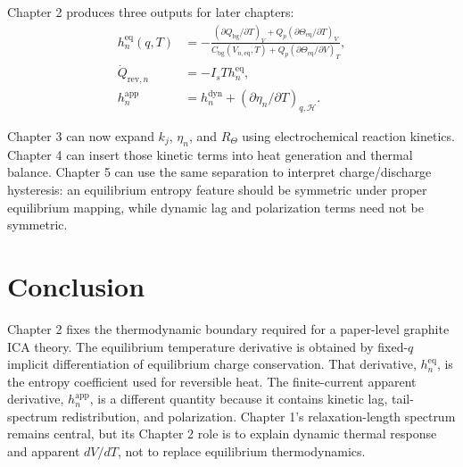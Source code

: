 \documentclass[11pt,a4paper]{article}
\newcommand{\eqs}{\mathrm{eq}}
\newcommand{\dyn}{\mathrm{dyn}}
\newcommand{\app}{\mathrm{app}}
\newcommand{\rev}{\mathrm{rev}}
\newcommand{\bg}{\mathrm{bg}}
\newcommand{\calH}{\mathcal H}
\begin{document}
Chapter 2 produces three outputs for later chapters:
\begin{align}
h_n^{\eqs}(q,T)
&=
-\frac{
\left(\partial Q_{\bg}/\partial T\right)_V
+Q_p\left(\partial\Theta_{\eqs}/\partial T\right)_V}
{C_{\bg}(V_{n,\eqs},T)
+Q_p\left(\partial\Theta_{\eqs}/\partial V\right)_T},
\label{eq:handoff_heq}\\
\dot Q_{\rev,n}
&=
-I_sT h_n^{\eqs},
\label{eq:handoff_qrev}\\
h_n^{\app}
&=
h_n^{\dyn}
+
\left(\partial\eta_n/\partial T\right)_{q,\calH}.
\label{eq:handoff_happ}
\end{align}

Chapter 3 can now expand \(k_j\), \(\eta_n\), and \(R_{\Theta}\) using electrochemical reaction kinetics.
Chapter 4 can insert those kinetic terms into heat generation and thermal balance. Chapter 5 can use the
same separation to interpret charge/discharge hysteresis: an equilibrium entropy feature should be symmetric
under proper equilibrium mapping, while dynamic lag and polarization terms need not be symmetric.

\section{Conclusion}\label{sec:conclusion}

Chapter 2 fixes the thermodynamic boundary required for a paper-level graphite ICA theory. The equilibrium
temperature derivative is obtained by fixed-\(q\) implicit differentiation of equilibrium charge conservation.
That derivative, \(h_n^{\eqs}\), is the entropy coefficient used for reversible heat. The finite-current
apparent derivative, \(h_n^{\app}\), is a different quantity because it contains kinetic lag, tail-spectrum
redistribution, and polarization. Chapter 1's relaxation-length spectrum remains central, but its Chapter 2
role is to explain dynamic thermal response and apparent \(dV/dT\), not to replace equilibrium thermodynamics.
\end{document}
